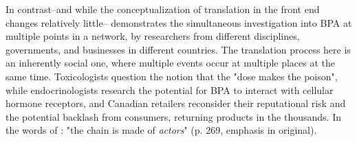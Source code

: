 
In contrast--and while the conceptualization of translation in the front end changes relatively little--\citet{Hardy2020} demonstrates the simultaneous investigation into BPA at multiple points in a network, by researchers from different disciplines, governments, and businesses in different countries. The translation process here is an inherently social one, where multiple events occur at multiple places at the same time. Toxicologists question the notion that the "dose makes the poison", while endocrinologists research the potential for BPA to interact with cellular hormone receptors, and Canadian retailers reconsider their reputational risk and the potential backlash from consumers, returning products in the thousands. In the words of \citet{Latour1984}: "the chain is made of \textit{actors}" (p. 269, emphasis in original).


